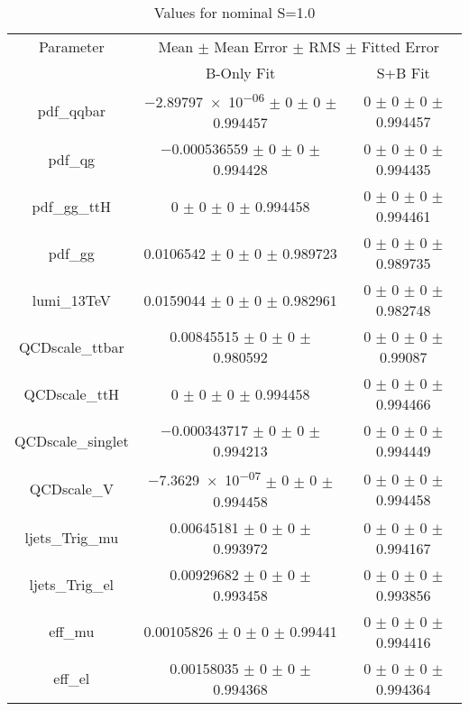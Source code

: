 \begin{table}
\centering
\caption{Values for nominal S=1.0}
\begin{tabular}{ccc}
\toprule
Parameter & \multicolumn{2}{c}{Mean $\pm$ Mean Error $\pm$ RMS $\pm$ Fitted Error}\\
 & B-Only Fit & S+B Fit\\
\midrule
pdf\_qqbar & \num{-2.89797e-06} $\pm$ \num{0} $\pm$ \num{0} $\pm$ \num{0.994457} & \num{0} $\pm$ \num{0} $\pm$ \num{0} $\pm$ \num{0.994457}\\
pdf\_qg & \num{-0.000536559} $\pm$ \num{0} $\pm$ \num{0} $\pm$ \num{0.994428} & \num{0} $\pm$ \num{0} $\pm$ \num{0} $\pm$ \num{0.994435}\\
pdf\_gg\_ttH & \num{0} $\pm$ \num{0} $\pm$ \num{0} $\pm$ \num{0.994458} & \num{0} $\pm$ \num{0} $\pm$ \num{0} $\pm$ \num{0.994461}\\
pdf\_gg & \num{0.0106542} $\pm$ \num{0} $\pm$ \num{0} $\pm$ \num{0.989723} & \num{0} $\pm$ \num{0} $\pm$ \num{0} $\pm$ \num{0.989735}\\
lumi\_13TeV & \num{0.0159044} $\pm$ \num{0} $\pm$ \num{0} $\pm$ \num{0.982961} & \num{0} $\pm$ \num{0} $\pm$ \num{0} $\pm$ \num{0.982748}\\
QCDscale\_ttbar & \num{0.00845515} $\pm$ \num{0} $\pm$ \num{0} $\pm$ \num{0.980592} & \num{0} $\pm$ \num{0} $\pm$ \num{0} $\pm$ \num{0.99087}\\
QCDscale\_ttH & \num{0} $\pm$ \num{0} $\pm$ \num{0} $\pm$ \num{0.994458} & \num{0} $\pm$ \num{0} $\pm$ \num{0} $\pm$ \num{0.994466}\\
QCDscale\_singlet & \num{-0.000343717} $\pm$ \num{0} $\pm$ \num{0} $\pm$ \num{0.994213} & \num{0} $\pm$ \num{0} $\pm$ \num{0} $\pm$ \num{0.994449}\\
QCDscale\_V & \num{-7.3629e-07} $\pm$ \num{0} $\pm$ \num{0} $\pm$ \num{0.994458} & \num{0} $\pm$ \num{0} $\pm$ \num{0} $\pm$ \num{0.994458}\\
ljets\_Trig\_mu & \num{0.00645181} $\pm$ \num{0} $\pm$ \num{0} $\pm$ \num{0.993972} & \num{0} $\pm$ \num{0} $\pm$ \num{0} $\pm$ \num{0.994167}\\
ljets\_Trig\_el & \num{0.00929682} $\pm$ \num{0} $\pm$ \num{0} $\pm$ \num{0.993458} & \num{0} $\pm$ \num{0} $\pm$ \num{0} $\pm$ \num{0.993856}\\
eff\_mu & \num{0.00105826} $\pm$ \num{0} $\pm$ \num{0} $\pm$ \num{0.99441} & \num{0} $\pm$ \num{0} $\pm$ \num{0} $\pm$ \num{0.994416}\\
eff\_el & \num{0.00158035} $\pm$ \num{0} $\pm$ \num{0} $\pm$ \num{0.994368} & \num{0} $\pm$ \num{0} $\pm$ \num{0} $\pm$ \num{0.994364}\\

\end{tabular}
\end{table}
